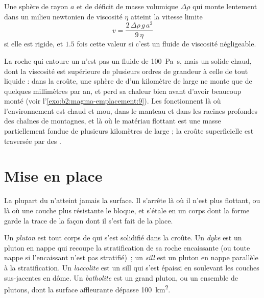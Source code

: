 \begin{proposition}\label{prop:b2:magma-emplacement:stokes}
Une sphère de rayon $a$ et de déficit de masse volumique $\Delta\rho$ qui monte lentement dans un
milieu newtonien de viscosité $\eta$ atteint la vitesse limite
\[
v = \frac{2\,\Delta\rho\,g\,a^2}{9\,\eta}
\]
si elle est rigide, et $1.5$ fois cette valeur si c'est un fluide de viscosité négligeable.
\end{proposition}
\admitted

La roche qui entoure un  n'est pas un fluide de \qty{100}{Pa.s}, mais un solide chaud,
dont la viscosité est supérieure de plusieurs ordres de grandeur à celle de tout liquide : dans la
croûte, une sphère de  d'un kilomètre de large ne monte que de quelques millimètres par an, et
perd sa chaleur bien avant d'avoir beaucoup monté (voir l'\cref{exo:b2:magma-emplacement:9}). Les 
fonctionnent là où l'environnement est chaud et mou, dans le manteau et dans les racines profondes
des chaînes de montagnes, et là où le matériau flottant est une masse partiellement fondue
de plusieurs kilomètres de large ; la croûte superficielle est traversée par des .

\section{Mise en place}

La plupart du  n'atteint jamais la surface. Il s'arrête là où il n'est plus flottant,
ou là où une couche plus résistante le bloque, et s'étale en un corps dont la forme
garde la trace de la façon dont il s'est fait de la place.

\begin{definition}\label{def:b2:magma-emplacement:bodies}
Un \emph{pluton} est tout corps de  qui s'est solidifié dans la
croûte. Un \emph{dyke} est un pluton en nappe qui recoupe la
stratification de sa roche encaissante (ou toute nappe si l'encaissant n'est pas stratifié)~; un
\emph{sill} est un pluton en nappe parallèle à la stratification. Un
\emph{laccolite} est un sill qui s'est épaissi en soulevant les
couches sus-jacentes en dôme. Un \emph{batholite} est un grand pluton,
ou un ensemble de plutons, dont la surface affleurante dépasse \qty{100}{km^2}.
\end{definition}

